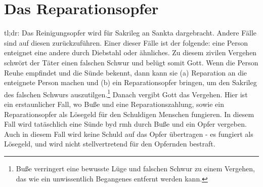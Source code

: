 \chapter{\label{app-reparationsopfer}Das Reparationsopfer}
tl;dr:
Das Reinigungsopfer wird für Sakrileg an Sankta dargebracht.
Andere Fälle sind auf diesen zurückzuführen.
Einer dieser Fälle ist der folgende: eine Person enteignet eine andere durch Diebstahl oder ähnliches.
Zu diesem zivilen Vergehen schwört der Täter einen falschen Schwur und belügt somit Gott.
Wenn die Person Reuhe empfindet und die Sünde bekennt, dann kann sie (a) Reparation an die enteignete Person machen und
(b) ein Reparationsopfer bringen, um den Sakrileg des falschen Schwurs auszutilgen.\footnote{
Buße verringert eine bewusste Lüge und falschen Schwur zu einem Vergehen, das wie ein unwissentlich Begangenes entfernt werden kann.
}
Danach vergibt Gott das Vergehen.
Hier ist ein erstaunlicher Fall, wo Buße und eine Reparationszahlung, sowie ein Reparationsopfer als Lösegeld für den Schuldigen Menschen fungieren.
In diesem Fall wird tatäschlich eine Sünde byd rmh durch Buße und ein Opfer vergeben.
Auch in diesem Fall wird keine Schuld auf das Opfer übertragen - es fungiert als Lösegeld, und wird nicht stellvertretend für den Opfernden bestraft.
